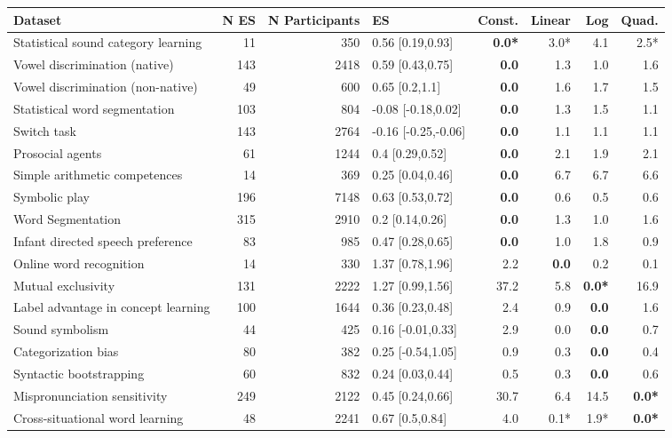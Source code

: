 \documentclass[10pt, letterpaper]{article}
\begin{document}
\begin{table}[ht]
\begin{tabular}{l|r|r|l|r|r|r|r}
\hline
\textbf{Dataset} & N ES & N Participants & ES & Const. & Linear & Log & Quad.\\
\hline
Statistical sound category learning  & 11 & 350 & 0.56 [0.19,0.93] & \textbf{0.0*} & 3.0* & 4.1 & 2.5*\\
Vowel discrimination (native) & 143 & 2418 & 0.59 [0.43,0.75] & \textbf{0.0} & 1.3 & 1.0 & 1.6\\
Vowel discrimination (non-native) & 49 & 600 & 0.65 [0.2,1.1] & \textbf{0.0} & 1.6 & 1.7 & 1.5\\
Statistical word segmentation & 103 & 804 & -0.08 [-0.18,0.02] & \textbf{0.0} & 1.3 & 1.5 & 1.1\\
Switch task & 143 & 2764 & -0.16 [-0.25,-0.06] & \textbf{0.0} & 1.1 & 1.1 & 1.1\\
Prosocial agents & 61 & 1244 & 0.4 [0.29,0.52] & \textbf{0.0} & 2.1 & 1.9 & 2.1\\
Simple arithmetic competences & 14 & 369 & 0.25 [0.04,0.46] & \textbf{0.0} & 6.7 & 6.7 & 6.6\\
Symbolic play & 196 & 7148 & 0.63 [0.53,0.72] & \textbf{0.0} & 0.6 & 0.5 & 0.6\\
Word Segmentation  & 315 & 2910 & 0.2 [0.14,0.26] & \textbf{0.0} & 1.3 & 1.0 & 1.6\\
Infant directed speech preference & 83 & 985 & 0.47 [0.28,0.65] & \textbf{0.0} & 1.0 & 1.8 & 0.9\\
Online word recognition & 14 & 330 & 1.37 [0.78,1.96] & 2.2 & \textbf{0.0} & 0.2 & 0.1\\
\rowcolor{lightgray}Mutual exclusivity & 131 & 2222 & 1.27 [0.99,1.56] & 37.2 & 5.8 & \textbf{0.0*} & 16.9\\
Label advantage in concept learning & 100 & 1644 & 0.36 [0.23,0.48] & 2.4 & 0.9 & \textbf{0.0} & 1.6\\
Sound symbolism & 44 & 425 & 0.16 [-0.01,0.33] & 2.9 & 0.0 & \textbf{0.0} & 0.7\\
Categorization bias & 80 & 382 & 0.25 [-0.54,1.05] & 0.9 & 0.3 & \textbf{0.0} & 0.4\\
Syntactic bootstrapping & 60 & 832 & 0.24 [0.03,0.44] & 0.5 & 0.3 & \textbf{0.0} & 0.6\\
\rowcolor{lightgray}Mispronunciation sensitivity & 249 & 2122 & 0.45 [0.24,0.66] & 30.7 & 6.4 & 14.5 & \textbf{0.0*}\\
Cross-situational word learning & 48 & 2241 & 0.67 [0.5,0.84] & 4.0 & 0.1* & 1.9* & \textbf{0.0*}\\

\end{tabular}
\end{table}
\end{document}
